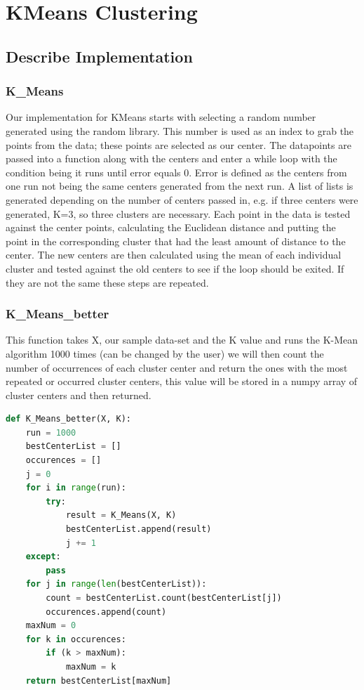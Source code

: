 \documentclass{article}
\begin{document}
	\section{KMeans Clustering}
	\subsection{Describe Implementation}

	\subsubsection{K\_Means}
		Our implementation for KMeans starts with selecting a random number generated using the random library. This number is used as an index to grab the points from the data; these points are selected as our center. \newline \newline
	  	The datapoints are passed into a function along with the centers and enter a while loop with the condition being it runs until error equals 0. Error is defined as the centers from one run not being the same centers generated from the next run. \newline \newline
		A list of lists is generated depending on the number of centers passed in, e.g. if three centers were generated, K=3, so three clusters are necessary. Each point in the data is tested against the center points, calculating the Euclidean distance and putting the point in the corresponding cluster that had the least amount of distance to the center. \newline \newline
	   	The new centers are then calculated using the mean of each individual cluster and tested against the old centers to see if the loop should be exited. If they are not the same these steps are repeated.
	\subsubsection{K\_Means\_better}
	This function takes X, our sample data-set and the K value and runs the K-Mean algorithm 1000 times (can be changed by the user) we will then count the number of occurrences of each cluster center and return the ones with the most repeated or occurred cluster centers, this value will be stored in a numpy array of cluster centers and then returned.
	\begin{lstlisting}[language=Python]
	def K_Means_better(X, K):
	run = 1000
	bestCenterList = []
	occurences = []
	j = 0
	for i in range(run):
		try:
			result = K_Means(X, K)
			bestCenterList.append(result)
			j += 1
	except:
		pass
	for j in range(len(bestCenterList)):
		count = bestCenterList.count(bestCenterList[j])
		occurences.append(count)
	maxNum = 0
	for k in occurences:
		if (k > maxNum):
			maxNum = k
	return bestCenterList[maxNum]
	\end{lstlisting}
\end{document}
